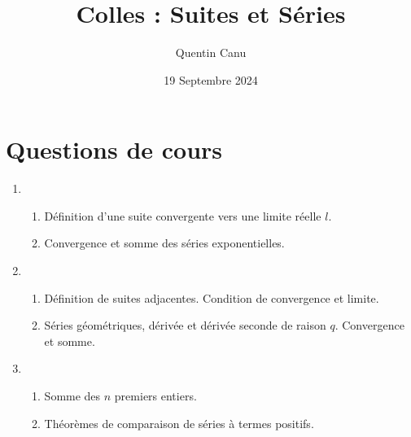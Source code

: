 \documentclass{article}
\title{Colles : Suites et Séries}
\author{Quentin Canu}
\date{19 Septembre 2024}
\begin{document}
\maketitle
\section{Questions de cours}
\begin{enumerate}
\item 
\begin{enumerate}[label=\alph*.]
\item Définition d'une suite convergente vers une limite réelle $l$.
\item Convergence et somme des séries exponentielles.
\end{enumerate}
\item 
\begin{enumerate}[label=\alph*.]
\item Définition de suites adjacentes. Condition de convergence et limite.
\item Séries géométriques, dérivée et dérivée seconde de raison $q$. Convergence et somme.
\end{enumerate}
\item 
\begin{enumerate}[label=\alph*.]
\item Somme des $n$ premiers entiers.
\item Théorèmes de comparaison de séries à termes positifs.
\end{enumerate}
\end{enumerate}
\end{document}
